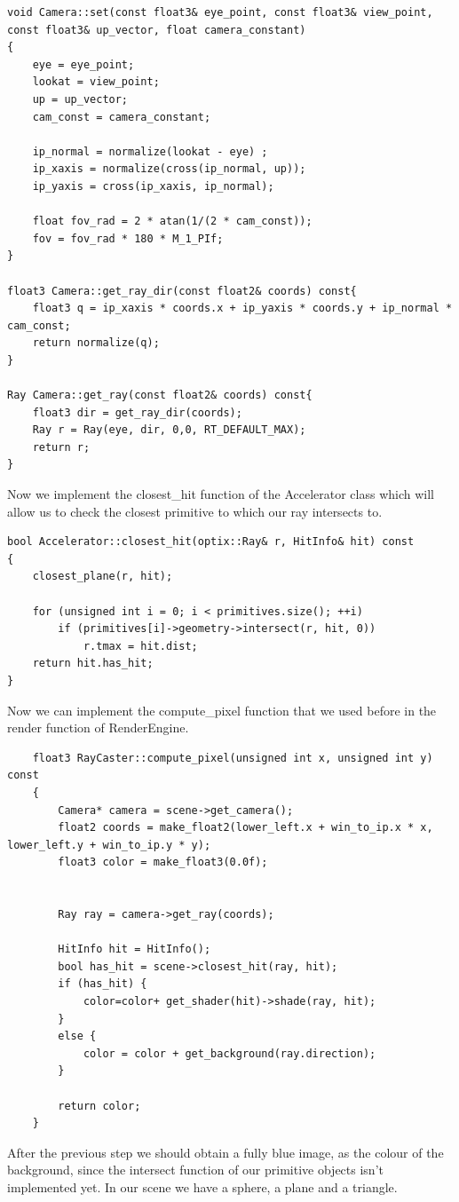 \begin{lstlisting}
void Camera::set(const float3& eye_point, const float3& view_point, const float3& up_vector, float camera_constant)
{
	eye = eye_point;
	lookat = view_point;
	up = up_vector;
	cam_const = camera_constant;
	
	ip_normal = normalize(lookat - eye) ;
	ip_xaxis = normalize(cross(ip_normal, up));
	ip_yaxis = cross(ip_xaxis, ip_normal);
	
	float fov_rad = 2 * atan(1/(2 * cam_const));
	fov = fov_rad * 180 * M_1_PIf;
}

float3 Camera::get_ray_dir(const float2& coords) const{
	float3 q = ip_xaxis * coords.x + ip_yaxis * coords.y + ip_normal * cam_const;
	return normalize(q);
}

Ray Camera::get_ray(const float2& coords) const{
	float3 dir = get_ray_dir(coords);
	Ray r = Ray(eye, dir, 0,0, RT_DEFAULT_MAX);
	return r; 
}
\end{lstlisting}
Now we implement the closest\_hit function of the Accelerator class which will allow us to check the closest primitive to which our ray intersects to.
\begin{lstlisting}
bool Accelerator::closest_hit(optix::Ray& r, HitInfo& hit) const
{
	closest_plane(r, hit);
	
	for (unsigned int i = 0; i < primitives.size(); ++i)
		if (primitives[i]->geometry->intersect(r, hit, 0))
			r.tmax = hit.dist;
	return hit.has_hit;
}
\end{lstlisting}
Now we can implement the compute\_pixel function that we used before in the render function of RenderEngine.
\begin{lstlisting}
	float3 RayCaster::compute_pixel(unsigned int x, unsigned int y) const
	{
		Camera* camera = scene->get_camera();
		float2 coords = make_float2(lower_left.x + win_to_ip.x * x, lower_left.y + win_to_ip.y * y);
		float3 color = make_float3(0.0f);
		
		
		Ray ray = camera->get_ray(coords);
		
		HitInfo hit = HitInfo();
		bool has_hit = scene->closest_hit(ray, hit);
		if (has_hit) {
			color=color+ get_shader(hit)->shade(ray, hit);
		}
		else {
			color = color + get_background(ray.direction);
		}
		
		return color;
	}
\end{lstlisting}
After the previous step we should obtain a fully blue image, as the colour of the background, since the intersect function of our primitive objects isn't implemented yet. In our scene we have a sphere, a plane and a triangle. 
